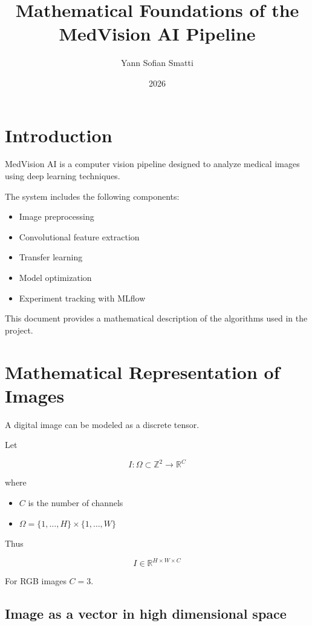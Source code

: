 ﻿\documentclass[11pt]{article}
\title{Mathematical Foundations of the MedVision AI Pipeline}
\author{Yann Sofian Smatti}
\date{2026}
\begin{document}
\maketitle

\tableofcontents

\newpage

\section{Introduction}

MedVision AI is a computer vision pipeline designed to analyze medical images
using deep learning techniques.

The system includes the following components:

\begin{itemize}
\item Image preprocessing
\item Convolutional feature extraction
\item Transfer learning
\item Model optimization
\item Experiment tracking with MLflow
\end{itemize}

This document provides a mathematical description of the algorithms
used in the project.

\section{Mathematical Representation of Images}

A digital image can be modeled as a discrete tensor.

Let

\[
I : \Omega \subset \mathbb{Z}^2 \rightarrow \mathbb{R}^C
\]

where

\begin{itemize}
\item $C$ is the number of channels
\item $\Omega = \{1,\dots,H\} \times \{1,\dots,W\}$
\end{itemize}

Thus

\[
I \in \mathbb{R}^{H \times W \times C}
\]

For RGB images $C = 3$.

\subsection{Image as a vector in high dimensional space}
\end{document}
